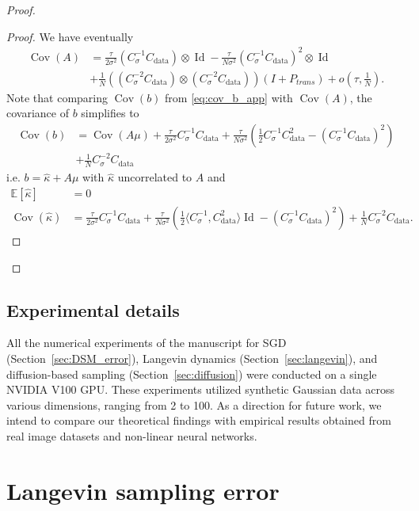 \documentclass[11pt]{article}
\newcommand{\id}{\operatorname{Id}}
\newcommand{\EE}{\mathbb{E}}
\newcommand{\cov}{\operatorname{Cov}}
\begin{document}
\begin{proof}
\begin{proof}
We have eventually 
\begin{equation*}
\begin{split}
    \cov(A) &= \frac{\tau}{2 \sigma^2} \left( C_\sigma^{-1} C_\mathrm{data} \right) \otimes  \id - \frac{\tau}{N \sigma^2} \left( C_\sigma^{-1} C_\mathrm{data} \right)^2 \otimes \id \\
&+ \frac{1}{N} ((C_\sigma^{-2} C_\mathrm{data}) \otimes (C_\sigma^{-2}C_\mathrm{data})) (I + P_{trans})
+ o \left(\tau, \frac{1}{N}\right)  .
\end{split}
\end{equation*}
Note that comparing $\cov(b)$ from \eqref{eq:cov_b_app} with $\cov(A)$, the covariance of $b$ simplifies to
\begin{align*}
\cov(b) &= \cov(A \mu) + \frac{\tau}{2 \sigma^2}C_\sigma^{-1} C_\mathrm{data} + \frac{\tau}{N \sigma^2} \left( \frac12C_\sigma^{-1} C_\mathrm{data}^2 -  (C_\sigma^{-1} C_\mathrm{data})^2 \right) \\ &+ \nonumber  \frac{1}{N} C_\sigma^{-2}C_\mathrm{data} 
\end{align*}
i.e. $b = \hat \kappa + A\mu$ with $\hat \kappa$ uncorrelated to $A$ and 
\begin{align*}
\EE[\hat \kappa] &= 0 \\
\cov(\hat \kappa) &= \frac{\tau}{2 \sigma^2}C_\sigma^{-1} C_\mathrm{data} + \frac{\tau}{N \sigma^2} \left( \frac12 \langle C_\sigma^{-1},  C_\mathrm{data}^2 \rangle \id -  (C_\sigma^{-1} C_\mathrm{data})^2 \right) +  \frac{1}{N} C_\sigma^{-2}C_\mathrm{data} .
\end{align*}
\end{proof}
\end{proof}

\subsection{Experimental details}
\label{app:exp}
All the numerical experiments of the manuscript for SGD (Section~\ref{sec:DSM_error}), Langevin dynamics (Section~\ref{sec:langevin}), and diffusion-based sampling (Section~\ref{sec:diffusion}) were conducted on a single NVIDIA V100 GPU. These experiments utilized synthetic Gaussian data across various dimensions, ranging from 2 to 100. As a direction for future work, we intend to compare our theoretical findings with empirical results obtained from real image datasets and non-linear neural networks.

\section{Langevin sampling error}
\end{document}

